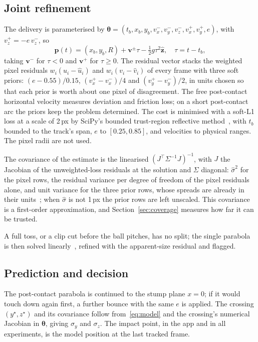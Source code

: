 \documentclass[journal]{IEEEtran}
\begin{document}
\subsection{Joint refinement}

The delivery is parameterised by $\boldsymbol{\theta} = (t_b, x_b, y_b,\allowbreak v_x^-, v_y^-, v_z^-,\allowbreak v_x^+, v_y^+, e)$,
with $v_z^+ = -e\, v_z^-$, so
\begin{equation}
\mathbf{p}(t) = (x_b, y_b, R) + \mathbf{v}^{\pm} \tau - \tfrac{1}{2} g \tau^2 \hat{\mathbf{z}}, \quad \tau = t - t_b,
\label{eq:model}
\end{equation}
taking $\mathbf{v}^-$ for $\tau < 0$ and $\mathbf{v}^+$ for $\tau \geq 0$. The residual vector stacks the
weighted pixel residuals $w_i (u_i - \hat{u}_i)$ and $w_i (v_i - \hat{v}_i)$ of every frame with three soft
priors: $(e - 0.55)/0.15$, $(v_x^+ - v_x^-)/4$ and $(v_y^+ - v_y^-)/2$, in units chosen so that each prior
is worth about one pixel of disagreement. The free post-contact horizontal velocity measures deviation and friction
loss; on a short post-contact arc the priors keep the problem determined. The cost is minimised with a soft-L1 loss at a scale of 2\,px by SciPy's bounded trust-region reflective
method~\cite{virtanen2020scipy}, with $t_b$ bounded to the track's span, $e$ to
$[0.25, 0.85]$, and velocities to physical ranges. The pixel radii are not used.

The covariance of the estimate is the linearised $(J^\top \Sigma^{-1} J)^{-1}$, with $J$ the Jacobian of the
unweighted-loss residuals at the solution and $\Sigma$ diagonal: $\hat{\sigma}^2$ for the pixel rows, the
residual variance per degree of freedom of the pixel residuals alone, and unit variance for the three prior
rows, whose spreads are already in their units~\cite{seber1989nonlinear}; when $\hat{\sigma}$ is not
1\,px the prior rows are left unscaled. This covariance
is a first-order approximation, and Section~\ref{sec:coverage} measures how far it can be trusted.

A full toss, or a clip cut before the ball pitches, has no split; the single parabola is then solved
linearly~\cite{ribnick2009projectiles}, refined with the apparent-size residual and flagged.

\subsection{Prediction and decision}
\label{sec:decision}

The post-contact parabola is continued to the stump plane $x = 0$; if it would touch down again first, a
further bounce with the same $e$ is applied. The crossing $(y^\star, z^\star)$ and its covariance follow
from~\eqref{eq:model} and the crossing's numerical Jacobian in $\boldsymbol{\theta}$, giving
$\sigma_y$ and $\sigma_z$. The impact point, in the app and in all experiments, is the model position at
the last tracked frame.
\end{document}
